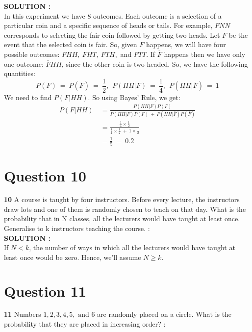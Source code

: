 \documentclass{article}
\begin{document}
\hspace{1em} \large{\textbf{SOLUTION :}} \\
In this experiment we have 8 outcomes. Each outcome is a selection of a particular coin and a specific sequence of heads or tails. For example, $FNN$ corresponds to selecting the fair coin followed by getting two heads. Let $F$ be the event that the selected coin is fair. So, given $F$ happens, we will have four possible outcomes: $FHH,\ FHT,\ FTH,$ and $FTT$. If $\overline{F}$ happens then we have only one outcome: $\overline{F}HH$, since the other coin is two headed. So, we have the following quantities:
\begin{equation*}
    P(F)\ =\ P(\overline{F})\ =\ \frac{1}{2},\ \ P(HH|F)\ =\ \frac{1}{4},\ \ P(HH|\overline{F})\ =\ 1  
\end{equation*}
We need to find $P(F|HH)$. So using Bayes' Rule, we get:
\begin{equation*}
    \begin{split}
        P(F|HH)\ &= \frac{P(HH|F)P(F)}{P(HH|F)P(F)\ +\ P(HH|\overline{F})P(\overline{F})} \\
                 &= \frac{   \frac{1}{4} \times  \frac{1}{2}   }{   \frac{1}{4} \times  \frac{1}{2}\ +\ 1 \times  \frac{1}{2}    }\\
                 &= \frac{1}{5}\ =\ 0.2
    \end{split}
\end{equation*}

\section{Question 10}
\label{Q10}
\textbf{10} A course is taught by four instructors. Before every lecture, the instructors draw lots and one of them is randomly chosen to teach on that day. What is the probability that in N classes, all the lecturers would have taught at least once. Generalise to k instructors teaching the course. : \\

\hspace{1em} \large{\textbf{SOLUTION :}} \\
    If $N < k$, the number of ways in which all the lecturers would have taught at least once would be zero. Hence, we’ll assume $N \geq k$.

\section{Question 11}
\label{Q11}
\textbf{11} Numbers $1, 2, 3, 4, 5, \text{ and } 6$ are randomly placed on a circle. What is the probability that they are placed in increasing order?  : \\
\end{document}
